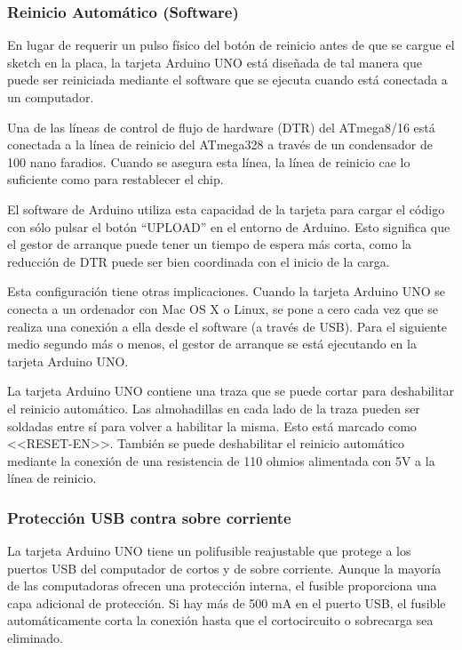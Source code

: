 \subsubsection{Reinicio Automático (Software)}
En lugar de requerir un pulso físico del botón de reinicio antes de que se cargue el sketch en la placa, la tarjeta Arduino UNO está diseñada de tal manera que puede ser reiniciada mediante el software que se ejecuta cuando está conectada a un computador.



Una de las líneas de control de flujo de hardware (DTR) del ATmega8/16 está conectada a la línea de reinicio del ATmega328 a través de un condensador de 100 nano faradios. Cuando se asegura esta línea, la línea de reinicio cae lo suficiente como para restablecer el chip. 



El software de Arduino utiliza esta capacidad de la tarjeta para cargar el código con sólo pulsar el botón “UPLOAD” en el entorno de Arduino. Esto significa que el gestor de arranque puede tener un tiempo de espera más corta, como la reducción de DTR puede ser bien coordinada con el inicio de la carga.



Esta configuración tiene otras implicaciones. Cuando la tarjeta Arduino UNO se conecta a un ordenador con Mac OS X o Linux, se pone a cero cada vez que se realiza una conexión a ella desde el software (a través de USB). Para el siguiente medio segundo más o menos, el gestor de arranque se está ejecutando en la tarjeta Arduino UNO. 



La tarjeta Arduino UNO contiene una traza que se puede cortar para deshabilitar el reinicio automático. Las almohadillas en cada lado de la traza pueden ser soldadas entre sí para volver a habilitar la misma. Esto está marcado como <<RESET-EN>>. También se puede deshabilitar el reinicio automático mediante la conexión de una resistencia de 110 ohmios alimentada con 5V a la línea de reinicio.



\subsubsection{Protección USB contra sobre corriente}
La tarjeta Arduino UNO tiene un polifusible reajustable que protege a los puertos USB del computador de cortos y de sobre corriente. Aunque la mayoría de las computadoras ofrecen una protección interna, el fusible proporciona una capa adicional de protección. Si hay más de 500 mA en el puerto USB, el fusible automáticamente corta la conexión hasta que el cortocircuito o sobrecarga sea eliminado.




